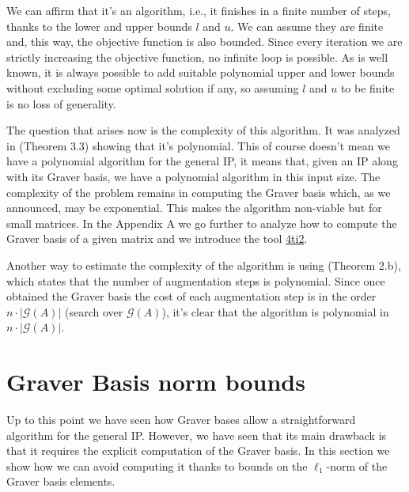 We can affirm that it's an algorithm, i.e., it finishes in a finite number of steps, thanks to the lower and upper bounds $l$ and $u$. We can assume they are finite and, this way, the objective function is also bounded. Since every iteration we are strictly increasing the objective function, no infinite loop is possible. As is well known, it is always possible to add suitable polynomial upper and lower bounds without excluding some optimal solution if any, so assuming $l$ and $u$ to be finite is no loss of generality.

The question that arises now is the complexity of this algorithm. It was analyzed in \cite{LHOW:2006} (Theorem 3.3) showing that it's polynomial. This of course doesn't mean we have a polynomial algorithm for the general IP, it means that, given an IP along with its Graver basis, we have a polynomial algorithm in this input size. The complexity of the problem remains in computing the Graver basis which, as we announced, may be exponential. This makes the algorithm non-viable but for small matrices. In the Appendix A we go further to analyze how to compute the Graver basis of a given matrix and we introduce the tool \href{https://4ti2.github.io/}{4ti2}.

Another way to estimate the complexity of the algorithm is using \cite{HOW:2009} (Theorem 2.b), which states that the number of augmentation steps is polynomial. Since once obtained the Graver basis the cost of each augmentation step is in the order $n \cdot |\mathcal{G}(A)|$ (search over $\mathcal{G}(A)$), it's clear that the algorithm is polynomial in $n \cdot |\mathcal{G}(A)|$.



\section{Graver Basis norm bounds}

Up to this point we have seen how Graver bases allow a straightforward algorithm for the general IP. However, we have seen that its main drawback is that it requires the explicit computation of the Graver basis. In this section we show how we can avoid computing it thanks to bounds on the $\ell_1$-norm of the Graver basis elements.

